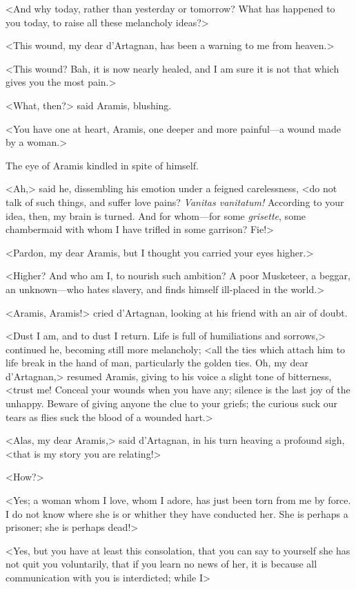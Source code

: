 <And why today, rather than yesterday or tomorrow? What has happened to you today, to raise all these melancholy ideas?> 

<This wound, my dear d'Artagnan, has been a warning to me from heaven.> 

<This wound? Bah, it is now nearly healed, and I am sure it is not that which gives you the most pain.> 

<What, then?> said Aramis, blushing. 

<You have one at heart, Aramis, one deeper and more painful---a wound made by a woman.> 

The eye of Aramis kindled in spite of himself. 

<Ah,> said he, dissembling his emotion under a feigned carelessness, <do not talk of such things, and suffer love pains? \textit{Vanitas vanitatum!} According to your idea, then, my brain is turned. And for whom---for some \textit{grisette}, some chambermaid with whom I have trifled in some garrison? Fie!> 

<Pardon, my dear Aramis, but I thought you carried your eyes higher.> 

<Higher? And who am I, to nourish such ambition? A poor Musketeer, a beggar, an unknown---who hates slavery, and finds himself ill-placed in the world.> 

<Aramis, Aramis!> cried d'Artagnan, looking at his friend with an air of doubt. 

<Dust I am, and to dust I return. Life is full of humiliations and sorrows,> continued he, becoming still more melancholy; <all the ties which attach him to life break in the hand of man, particularly the golden ties. Oh, my dear d'Artagnan,> resumed Aramis, giving to his voice a slight tone of bitterness, <trust me! Conceal your wounds when you have any; silence is the last joy of the unhappy. Beware of giving anyone the clue to your griefs; the curious suck our tears as flies suck the blood of a wounded hart.> 

<Alas, my dear Aramis,> said d'Artagnan, in his turn heaving a profound sigh, <that is my story you are relating!> 

<How?> 

<Yes; a woman whom I love, whom I adore, has just been torn from me by force. I do not know where she is or whither they have conducted her. She is perhaps a prisoner; she is perhaps dead!> 

<Yes, but you have at least this consolation, that you can say to yourself she has not quit you voluntarily, that if you learn no news of her, it is because all communication with you is interdicted; while I\longdash> 

